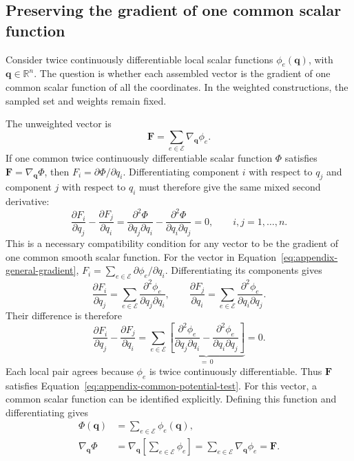 \documentclass[a4paper,12pt]{article}
\newcommand{\vect}[1]{\boldsymbol{#1}}
\begin{document}
\subsection{Preserving the gradient of one common scalar function}
\label{sec:appendix-gradient-structure}

Consider twice continuously differentiable local scalar functions $\phi_e(\vect{q})$, with $\vect{q}\in\mathbb R^n$. The question is whether each assembled vector is the gradient of one common scalar function of all the coordinates. In the weighted constructions, the sampled set and weights remain fixed.

The unweighted vector is
\begin{equation}
 \vect{F}
 =\sum_{e\in\mathcal E}\nabla_{\vect{q}}\phi_e.
 \label{eq:appendix-general-gradient}
\end{equation}
If one common twice continuously differentiable scalar function $\Phi$ satisfies $\vect{F}=\nabla_{\vect{q}}\Phi$, then $F_i=\partial\Phi/\partial q_i$. Differentiating component $i$ with respect to $q_j$ and component $j$ with respect to $q_i$ must therefore give the same mixed second derivative:
\begin{equation}
 \frac{\partial F_i}{\partial q_j}
 -\frac{\partial F_j}{\partial q_i}
 =\frac{\partial^2\Phi}{\partial q_j\partial q_i}
 -\frac{\partial^2\Phi}{\partial q_i\partial q_j}
 =0,
 \qquad i,j=1,\ldots,n.
 \label{eq:appendix-common-potential-test}
\end{equation}
This is a necessary compatibility condition for any vector to be the gradient of one common smooth scalar function. For the vector in Equation~\eqref{eq:appendix-general-gradient}, $F_i=\sum_{e\in\mathcal E}\partial \phi_e/\partial q_i$. Differentiating its components gives
\[
 \frac{\partial F_i}{\partial q_j}
 =\sum_{e\in\mathcal E}\frac{\partial^2\phi_e}{\partial q_j\partial q_i},
 \qquad
 \frac{\partial F_j}{\partial q_i}
 =\sum_{e\in\mathcal E}\frac{\partial^2\phi_e}{\partial q_i\partial q_j}.
\]
Their difference is therefore
\[
 \frac{\partial F_i}{\partial q_j}
 -\frac{\partial F_j}{\partial q_i}
 =\sum_{e\in\mathcal E}
   \underbrace{\left[
    \frac{\partial^2\phi_e}{\partial q_j\partial q_i}
    -\frac{\partial^2\phi_e}{\partial q_i\partial q_j}
   \right]}_{=\,0}
 =0.
\]
Each local pair agrees because $\phi_e$ is twice continuously differentiable. Thus $\vect{F}$ satisfies Equation~\eqref{eq:appendix-common-potential-test}. For this vector, a common scalar function can be identified explicitly. Defining this function and differentiating gives
\[
 \begin{aligned}
 \Phi(\vect{q})
 &=\sum_{e\in\mathcal E}\phi_e(\vect{q}),\\
 \nabla_{\vect{q}}\Phi
 &=\nabla_{\vect{q}}\left[\sum_{e\in\mathcal E}\phi_e\right]
 =\sum_{e\in\mathcal E}\nabla_{\vect{q}}\phi_e
 =\vect{F}.
 \end{aligned}
\]
\end{document}
